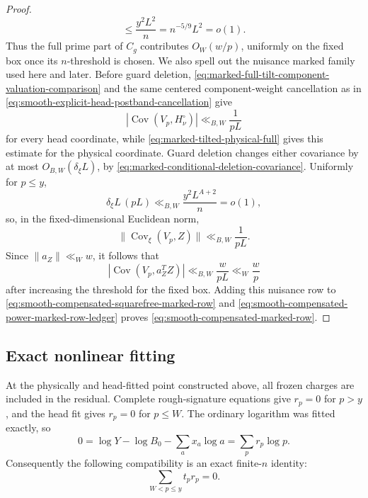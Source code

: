 \documentclass[11pt]{article}
\numberwithin{equation}{section}
\theoremstyle{definition}
\theoremstyle{remark}
\newcommand{\1}{\mathbf 1}
\begin{document}
\begin{proof}
\begin{equation}
 \leq\frac{y^2L^2}{n}=n^{-5/9}L^2=o(1).
 \label{eq:smooth-compensated-marked-row-endpoints}
\end{equation}
Thus the full prime part of \(C_g\) contributes \(O_W(w/p)\), uniformly
on the fixed box once its \(n\)-threshold is chosen.  We also spell out
the nuisance marked family used here and later.  Before guard deletion,
\eqref{eq:marked-full-tilt-component-valuation-comparison} and the same
centered component-weight cancellation as in
\eqref{eq:smooth-explicit-head-postband-cancellation} give
\[
 |\operatorname{Cov}(V_p,H_\nu^\circ)|\ll_{B,W}\frac1{pL}
\]
for every head coordinate, while
\eqref{eq:marked-tilted-physical-full} gives this estimate for the
physical coordinate.  Guard deletion changes either covariance by at
most \(O_{B,W}(\delta_\xi L)\), by
\eqref{eq:marked-conditional-deletion-covariance}.  Uniformly for
\(p\leq y\),
\[
 \delta_\xi L\,(pL)\ll_{B,W}\frac{y^2L^{A+2}}n=o(1),
\]
so, in the fixed-dimensional Euclidean norm,
\begin{equation}
 \|\operatorname{Cov}_\xi(V_p,Z)\|\ll_{B,W}\frac1{pL}.
 \label{eq:smooth-explicit-nuisance-marked-family}
\end{equation}
Since \(\|a_Z\|\ll_Ww\), it follows that
\[
 |\operatorname{Cov}(V_p,a_Z^TZ)|\ll_{B,W}\frac w{pL}
 \ll_W\frac wp
\]
after increasing the threshold for the fixed box.
Adding this nuisance row to
\eqref{eq:smooth-compensated-squarefree-marked-row} and
\eqref{eq:smooth-compensated-power-marked-row-ledger} proves
\eqref{eq:smooth-compensated-marked-row}.
\end{proof}

\subsection{Exact nonlinear fitting}
\label{subsec:smooth-nonlinear-fit}

At the physically and head-fitted point constructed above, all frozen
charges are included in the residual.  Complete rough-signature equations
give \(r_p=0\) for \(p>y\), and the head fit gives \(r_p=0\) for
\(p\leq W\).  The ordinary logarithm was fitted exactly, so
\[
 0=\log Y-\log B_0-\sum_ax_a\log a
   =\sum_pr_p\log p.
\]
Consequently the following compatibility is an exact finite-\(n\)
identity:
\begin{equation}
                         \sum_{W<p\leq y}t_pr_p=0.
\label{eq:smooth-exact-physical-compatibility}
\end{equation}
\end{document}

